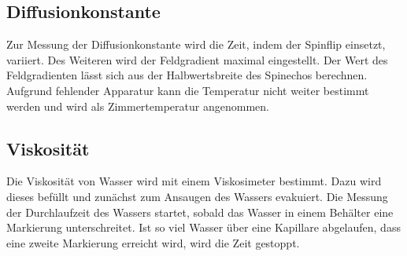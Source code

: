 \subsection{Diffusionkonstante}%
\label{sub:diffusionskonstante}
Zur Messung der Diffusionkonstante wird die Zeit, indem der Spinflip einsetzt,
variiert.
Des Weiteren wird der Feldgradient maximal eingestellt.
Der Wert des Feldgradienten lässt sich aus der Halbwertsbreite des Spinechos
berechnen.
Aufgrund fehlender Apparatur kann die Temperatur nicht weiter bestimmt werden
und wird als Zimmertemperatur angenommen.

\subsection{Viskosität}
Die Viskosität von Wasser wird mit einem Viskosimeter bestimmt. Dazu wird
dieses befüllt und zunächst zum Ansaugen des Wassers evakuiert.
Die Messung der Durchlaufzeit des Wassers startet, sobald das Wasser in einem
Behälter eine Markierung unterschreitet.
Ist so viel Wasser über eine Kapillare abgelaufen, dass eine zweite Markierung
erreicht wird, wird die Zeit gestoppt.
